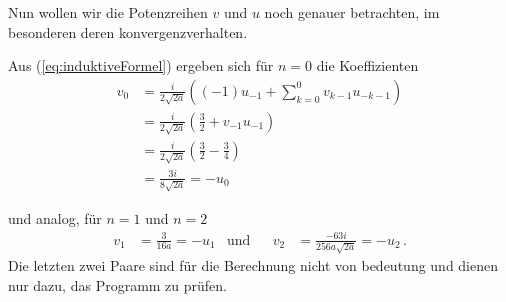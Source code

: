 Nun wollen wir die Potenzreihen $v$ und $u$ noch genauer betrachten, im
besonderen deren konvergenzverhalten.

Aus (\ref{eq:induktiveFormel}) ergeben sich für $n=0$ die Koeffizienten
\begin{align*}
v_{0} &= \frac{i}{2\sqrt{2a}}
  ((-1)u_{-1} + \sum_{k=0}^{0} v_{k-1}u_{-k-1})
\\&= \frac{i}{2\sqrt{2a}} (\frac{3}{2} + v_{-1}u_{-1})
\\&= \frac{i}{2\sqrt{2a}} (\frac{3}{2} - \frac{3}{4})
\\&= \frac{3i}{8\sqrt{2a}} = -u_{0}
\end{align*}
\iffalse
  \begin{comment}
  Somit ergeben sich für $n=1$ die Koeffizienten
  \begin{align*}
  v_1 &= \frac{i}{2\sqrt{2a}}
    ((1-1)u_{1-1} + \sum_{k=0}^{1} v_{k-1}u_{1-k-1})
  \\&= \frac{i}{2\sqrt{2a}} (v_{-1}u_{0} + v_{0}u_{-1})
  \\&= \frac{iv_0}{2\sqrt{2a}} (-v_{-1} + u_{-1})
  \\&= \frac{3i\cdoti}{2\sqrt{2a}\cdot8\sqrt{2a}} (-\frac{1}{2} - \frac{3}{2})
  \\&= \frac{-3}{16\cdot2a} (-2)
  \\&= \frac{3}{16a} = -u_1
  & \overset{a=\frac{1}{8}}{=} 1.5
  \end{align*}
  und für $n=2$ ist
  \begin{align*}
  v_2 &=\frac{i}{2\sqrt{2a}} ((2-1)u_{2-1} + \sum_{k=0}^{2} v_{k-1}u_{2-k-1})
  \\&=\frac{i}{2\sqrt{2a}} (u_{1} + v_{-1}u_{1} + v_{0}u_{0} + v_{1}u_{-1})
  \\&=\frac{i}{2\sqrt{2a}} (\frac{-3}{16a}
    + \frac{1}{2}\frac{-3}{16a}
    + \frac{3i}{8\sqrt{2a}}\frac{-3i}{8\sqrt{2a}}
    + \frac{3}{16a}\frac{-3}{2})
  \\&=\frac{i}{2\sqrt{2a}} (-\frac{3}{16a} - \frac{3}{32a} + \frac{9}{8^22a}
    - \frac{9}{32a})
  \\&=\frac{i}{2\sqrt{2a}} (-\frac{24}{128a} - \frac{12}{128a} + \frac{9}{128a}
    - \frac{36}{128a})
  \\&=\frac{i(-24-12+9-36)}{256a\sqrt{2a}}
  \\&=\frac{-63i}{256a\sqrt{2a}} = -u_2
  & \overset{a=\frac{1}{8}}{\approx} -3.9375i
  \end{align*}
  \end{comment}
\fi
und analog, für $n=1$ und $n=2$
\begin{align*}
v_1&= \frac{3}{16a} = -u_1 &\mbox{und}
  & & v_2&=\frac{-63i}{256a\sqrt{2a}} = -u_2 \,.
\end{align*}
Die letzten zwei Paare sind für die Berechnung nicht von bedeutung und dienen
nur dazu, das Programm zu prüfen.

